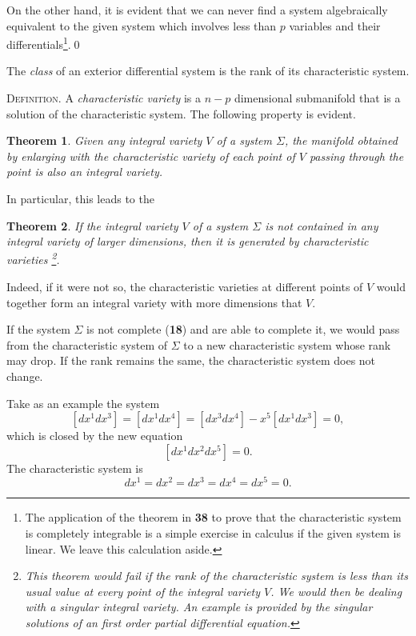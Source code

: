 \documentclass[leqno,11pt]{book}
\numberwithin{equation}{chapter}
\theoremstyle{shape1}
\newtheorem*{thm*}{\hspace{15pt}Theorem}
\theoremstyle{shape0}
\theoremstyle{shape2}
\theoremstyle{definition}
\begin{document}
On the other hand, it is evident that we can never find a system algebraically equivalent to the given system which involves less than $p$ variables and their differentials\footnote{The application of the theorem in \textsection\textbf{38} to prove that the characteristic system is completely integrable is a simple  exercise in calculus if the given system is linear. We leave this calculation aside.}.\qed

The \emph{class} of an exterior differential system is the rank of its characteristic system.


\vspace{12pt}\fsec \textsc{Definition.}  {A} \emph{characteristic variety} {is a $n-p$ dimensional submanifold that is a solution of the characteristic system. The following property is evident.}

\begin{thm*}
  Given any integral variety $V$ of a system $\Sigma$, the manifold obtained by enlarging with the characteristic variety of each point of $V$ passing through the point is also an integral variety.
\end{thm*}

In particular, this leads to the 
\begin{thm*}
  If the integral variety $V$ of a system $\Sigma$ is not contained in any integral variety of larger dimensions, then it is generated by  characteristic varieties \footnote{ This theorem would fail if the rank of the characteristic system is less than its usual value  at every point of the integral variety $V$. We would then be dealing with a singular integral variety. An example is provided by the singular solutions of an first order partial differential equation.}.
\end{thm*}

Indeed, if it were not so, the characteristic varieties at  different points of $V$ would together form an integral variety with more dimensions that $V$.

\vspace{12pt}\fsec If the system $\Sigma$ is not complete (\textsection\textbf{18}) and are able to complete it, we would pass from the characteristic system of $\Sigma$ to a new characteristic system whose rank may drop. If the rank remains the same, the characteristic system does not change.

Take as an example the system
\begin{equation}
  \label{eq:3.13}
  [dx^{1}dx^{3}]=[dx^{1}dx^{4}]=[dx^{3}dx^{4}]-x^{5}[dx^{1}dx^{3}]=0,
\end{equation}
which is closed by the new equation
\begin{equation}
  \label{eq:3.14}
  [dx^{1}dx^{2}dx^{5}]=0.
\end{equation}
The characteristic system is
\[
dx^{1}=dx^{2}=dx^{3}=dx^{4}=dx^{5}=0.
\]
\end{document}
